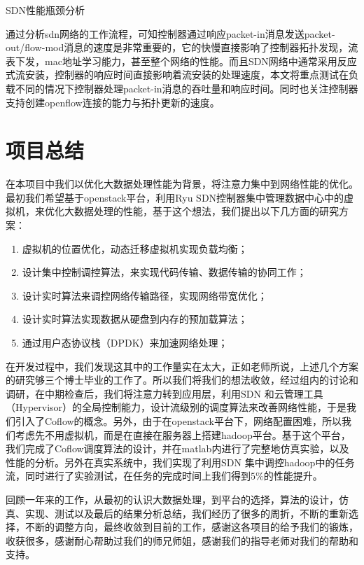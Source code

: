 \documentclass[a4paper, 11pt]{article}                                                   %
\begin{document}
\begin{CJK*}{UTF8}{song}
SDN性能瓶颈分析

通过分析sdn网络的工作流程，可知控制器通过响应packet-in消息发送packet-out/flow-mod消息的速度是非常重要的，它的快慢直接影响了控制器拓扑发现，流表下发，mac地址学习能力，甚至整个网络的性能。而且SDN网络中通常采用反应式流安装，控制器的响应时间直接影响着流安装的处理速度，本文将重点测试在负载不同的情况下控制器处理packet-in消息的吞吐量和响应时间。同时也关注控制器支持创建openflow连接的能力与拓扑更新的速度。

\section{项目总结}
在本项目中我们以优化大数据处理性能为背景，将注意力集中到网络性能的优化。最初我们希望基于openstack平台，利用Ryu SDN控制器集中管理数据中心中的虚拟机，来优化大数据处理的性能，基于这个想法，我们提出以下几方面的研究方案：

\begin{enumerate}
  \item 虚拟机的位置优化，动态迁移虚拟机实现负载均衡；
  \item 设计集中控制调控算法，来实现代码传输、数据传输的协同工作；
  \item 设计实时算法来调控网络传输路径，实现网络带宽优化；
  \item 设计实时算法实现数据从硬盘到内存的预加载算法；
  \item 通过用户态协议栈（DPDK）来加速网络处理；
\end{enumerate}
在开发过程中，我们发现这其中的工作量实在太大，正如老师所说，上述几个方案的研究够三个博士毕业的工作了。所以我们将我们的想法收敛，经过组内的讨论和调研，在中期检查后，我们将注意力转到应用层，利用SDN 和云管理工具（Hypervisor）的全局控制能力，设计流级别的调度算法来改善网络性能，于是我们引入了Coflow的概念。另外，由于在openstack平台下，网络配置困难，所以我们考虑先不用虚拟机，而是在直接在服务器上搭建hadoop平台。基于这个平台，我们完成了Coflow调度算法的设计，并在matlab内进行了完整地仿真实验，以及性能的分析。另外在真实系统中，我们实现了利用SDN 集中调控hadoop中的任务流，同时进行了实验测试，在任务的完成时间上我们得到$5\%$的性能提升。

回顾一年来的工作，从最初的认识大数据处理，到平台的选择，算法的设计，仿真、实现、测试以及最后的结果分析总结，我们经历了很多的周折，不断的重新选择，不断的调整方向，最终收敛到目前的工作，感谢这各项目的给予我们的锻炼，收获很多，感谢耐心帮助过我们的师兄师姐，感谢我们的指导老师对我们的帮助和支持。


\nocite{*}
%





\clearpage
\end{CJK*}                                     %
\end{document}

